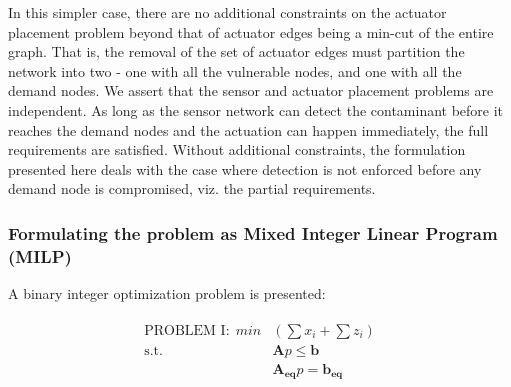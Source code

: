 \documentclass[authoryear,preprint,review,12pt]{elsarticle}
\begin{document}
In this simpler case, there are no additional constraints on the actuator
placement problem beyond that of actuator edges being a min-cut of
the entire graph. That is, the removal of the set of actuator edges must partition the
network into two - one with all the vulnerable nodes, and one with all the demand nodes.
We assert that the sensor and actuator placement problems are independent. %
As long as the sensor network can detect the contaminant before it
reaches the demand nodes and the actuation can happen immediately, the
full requirements are satisfied. Without additional constraints, the
formulation presented here deals with the case where detection is
not enforced before any demand node is compromised, viz. the partial
requirements. %


\subsubsection{Formulating the problem as  Mixed Integer Linear Program (MILP)}
A binary integer optimization problem is presented:

\begin{eqnarray}
\begin{aligned}
\text{PROBLEM I:}~~ min & (\sum x_{i}+\sum z_{i})\\
\text{s.t.}~& \mathbf{A}
p
 \leq \mathbf{b}\\
& \mathbf{A_{eq}}p =  \mathbf{b_{eq}}
\end{aligned}
\end{eqnarray}

\end{document}
